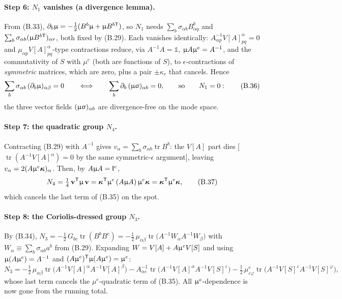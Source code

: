 \paragraph{Step 6: $N_1$ vanishes (a divergence lemma).}
From (B.33), $\partial_b\upmu=-\tfrac12(B^{b}\upmu+\upmu B^{b\mathsf T})$, so $N_1$ needs $\sum_b\sigma_{\alpha b}B^{b}_{\alpha q}$ and $\sum_b\sigma_{\alpha b}(\upmu B^{b\mathsf T})_{\alpha r}$, both fixed by (B.29). Each vanishes identically: $A^{-1}_{\alpha p}V[A]^{\alpha}_{pq}=0$ and $\mu_{\alpha p}V[A]^{\alpha}_{pq}$-type contractions reduce, via $A^{-1}A=\mathbb 1$, $\upmu A\upmu^{e}=A^{-1}$, and the commutativity of $S$ with $\mu^{e}$ (both are functions of $S$), to $\epsilon$-contractions of \emph{symmetric} matrices, which are zero, plus a pair $\pm\kappa_r$ that cancels. Hence
\begin{equation}
\sum_b\sigma_{\alpha b}\,(\partial_b\upmu)_{\alpha\beta}=0
\qquad\Longleftrightarrow\qquad
\sum_b\partial_b\,(\upmu\upsigma)_{\alpha b}=0,
\qquad\text{so}\qquad N_1=0 : \tag{B.36}
\end{equation}
the three vector fields $(\upmu\upsigma)_{\alpha b}$ are divergence-free on the mode space.

\paragraph{Step 7: the quadratic group $N_4$.}
Contracting (B.29) with $A^{-1}$ gives $v_\alpha=\sum_b\sigma_{\alpha b}\operatorname{tr}B^b$: the $V[A]$ part dies [$\operatorname{tr}(A^{-1}V[A]^{\alpha})=0$ by the same symmetric-$\epsilon$ argument], leaving $v_\alpha=2(A\upmu^{e}\boldsymbol\kappa)_\alpha$. Then, by $A\upmu A=\mathsf I^{e}$,
\begin{equation}
N_4=\tfrac14\,\mathbf v^{\mathsf T}\upmu\,\mathbf v
=\boldsymbol\kappa^{\mathsf T}\upmu^{e}\,(A\upmu A)\,\upmu^{e}\boldsymbol\kappa
=\boldsymbol\kappa^{\mathsf T}\upmu^{e}\boldsymbol\kappa , \tag{B.37}
\end{equation}
which cancels the last term of (B.35) on the spot.

\paragraph{Step 8: the Coriolis-dressed group $N_3$.}
By (B.34), $N_3=-\tfrac12\,G_{bc}\operatorname{tr}(B^bB^c)=-\tfrac12\,\mu_{\alpha\beta}\operatorname{tr}\bigl(A^{-1}W_\alpha A^{-1}W_\beta\bigr)$ with $W_\alpha\equiv\sum_b\sigma_{\alpha b}a^b$ from (B.29). Expanding $W=V[A]+A\upmu^{e}V[S]$ and using $\upmu(A\upmu^{e})=A^{-1}$ and $(A\upmu^{e})^{\mathsf T}\upmu(A\upmu^{e})=\upmu^{e}$:
\begin{equation}
N_3=-\tfrac12\,\mu_{\alpha\beta}\operatorname{tr}\bigl(A^{-1}V[A]^{\alpha}A^{-1}V[A]^{\beta}\bigr)
-A^{-1}_{\alpha\varepsilon}\operatorname{tr}\bigl(A^{-1}V[A]^{\alpha}A^{-1}V[S]^{\varepsilon}\bigr)
-\tfrac12\,\mu^{e}_{\varepsilon\varphi}\operatorname{tr}\bigl(A^{-1}V[S]^{\varepsilon}A^{-1}V[S]^{\varphi}\bigr) , \tag{B.38}
\end{equation}
whose last term cancels the $\mu^{e}$-quadratic term of (B.35). All $\upmu^{e}$-dependence is now gone from the running total.

